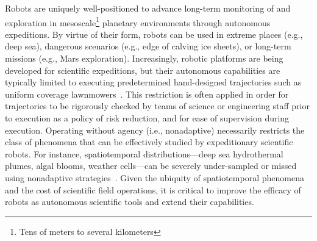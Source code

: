 Robots are uniquely well-positioned to advance long-term monitoring of and exploration in mesoscale\footnote{Tens of meters to several kilometers} planetary environments through autonomous expeditions.
By virtue of their form, robots can be used in extreme places (e.g., deep sea), dangerous scenarios (e.g., edge of calving ice sheets), or long-term missions (e.g., Mars exploration). Increasingly, robotic platforms are being developed for scientific expeditions, but their autonomous capabilities are typically limited to executing predetermined hand-designed trajectories such as uniform coverage lawnmowers~\autocite{camilli2010tracking}.
This restriction is often applied in order for trajectories to be rigorously checked by teams of science or engineering staff prior to execution as a policy of risk reduction, and for ease of supervision during execution.
Operating without agency (i.e., nonadaptive) necessarily restricts the class of phenomena that can be effectively studied by expeditionary scientific robots.
For instance, spatiotemporal distributions---deep sea hydrothermal plumes, algal blooms, weather cells---can be severely under-sampled or missed using nonadaptive strategies~\autocite{flaspohler2019information}.
Given the ubiquity of spatiotemporal phenomena and the cost of scientific field operations, it is critical to improve the efficacy of robots as autonomous scientific tools and extend their capabilities.

